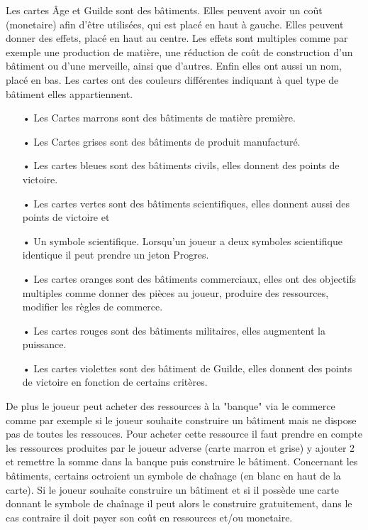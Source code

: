 \documentclass[12pt]{article}
\begin{document}
    	Les cartes Âge et Guilde sont des bâtiments. Elles peuvent avoir un coût (monetaire) afin d'être
    	utilisées, qui est placé en haut à gauche. Elles peuvent donner des effets, placé en haut au centre.
    	Les effets sont multiples comme par exemple une production de matière, une réduction de coût de construction d'un bâtiment ou d'une merveille, ainsi que d'autres. Enfin elles ont aussi un nom, placé en bas. Les cartes ont des couleurs différentes indiquant à quel type de bâtiment elles appartiennent.
    	\begin{itemize}
    		\item[•] Les Cartes marrons sont des bâtiments de matière première.
    		\item[•] Les Cartes grises sont des bâtiments de produit manufacturé.
    		\item[•] Les cartes bleues sont des bâtiments civils, elles donnent des points de victoire.
    		\item[•] Les cartes vertes sont des bâtiments scientifiques, elles donnent aussi des points de victoire et
    		\item[•] Un symbole scientifique. Lorsqu'un joueur a deux symboles scientifique identique
    		il peut prendre un jeton Progres.
    		\item[•] Les cartes oranges sont des bâtiments commerciaux, elles ont des objectifs multiples comme donner
    		des pièces au joueur, produire des ressources, modifier les règles de commerce.
    		\item[•] Les cartes rouges sont des bâtiments militaires, elles augmentent la puissance.
    		\item[•] Les cartes violettes sont des bâtiment de Guilde, elles donnent des points de victoire en fonction
    		de certains critères.
    	\end{itemize}
    
    	De plus le joueur peut acheter des ressources à la "banque" via le commerce comme par exemple si le joueur souhaite construire un bâtiment mais ne dispose pas de toutes les ressouces. Pour acheter cette ressource il faut prendre en compte les ressources produites par le joueur adverse (carte marron et grise) y ajouter 2 et remettre la somme dans la banque puis construire le bâtiment. Concernant les bâtiments, certains octroient un symbole de chaînage (en blanc en haut de la carte). Si le joueur souhaite construire un bâtiment et si il possède une carte donnant le symbole de chaînage il peut alors le construire gratuitement, dans le cas contraire il doit payer son coût en ressources et/ou monetaire.
    
\end{document}
